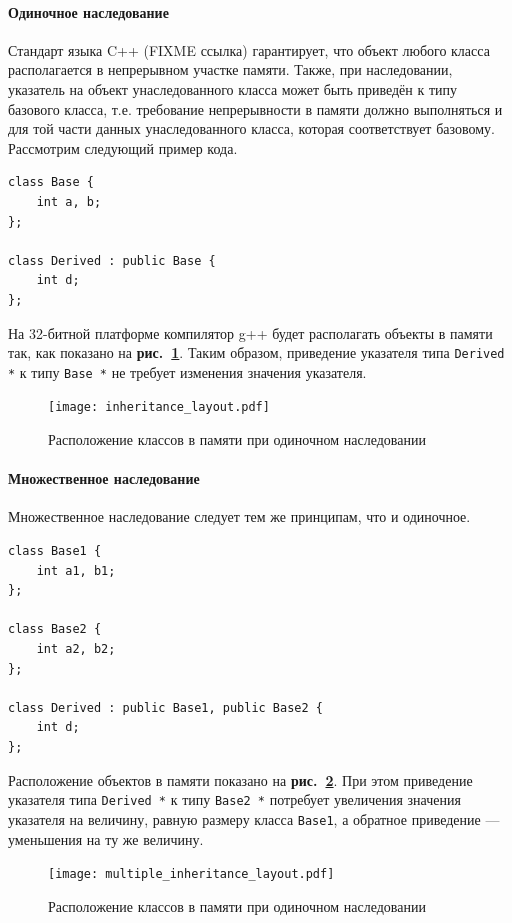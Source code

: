 \documentclass[a4paper,12pt,russian]{article}
\newcommand{\picref}[1]{\textbf{рис.~\ref{#1}}}
\begin{document}
\paragraph{Одиночное наследование}
Стандарт языка C++ (FIXME ссылка) гарантирует, что объект любого класса располагается в непрерывном участке памяти.
Также, при наследовании, указатель на объект унаследованного класса может быть приведён к типу базового класса, т.е. требование непрерывности в памяти должно выполняться и для той части данных унаследованного класса, которая соответствует базовому.
Рассмотрим следующий пример кода.
\begin{lstlisting}
class Base {
    int a, b;
};

class Derived : public Base {
    int d;
};
\end{lstlisting}
На 32-битной платформе компилятор g++ будет располагать объекты в памяти так, как показано на \picref{inheritance_layout_fig}. Таким образом, приведение указателя типа \texttt{Derived *} к типу \texttt{Base *} не требует изменения значения указателя.
\begin{figure}
  \center
  \texttt{[image: inheritance\_layout.pdf]}
  \hfill
  \caption{Расположение классов в памяти при одиночном наследовании}
  \label{inheritance_layout_fig}
\end{figure}

\paragraph{Множественное наследование}
Множественное наследование следует тем же принципам, что и одиночное.
\begin{lstlisting}
class Base1 {
    int a1, b1;
};

class Base2 {
    int a2, b2;
};

class Derived : public Base1, public Base2 {
    int d;
};
\end{lstlisting}
Расположение объектов в памяти показано на \picref{multiple_inheritance_layout_fig}.
При этом приведение указателя типа \texttt{Derived *} к типу \texttt{Base2 *} потребует увеличения значения указателя на величину, равную размеру класса \texttt{Base1}, а обратное приведение --- уменьшения на ту же величину.
\begin{figure}
  \center
  \texttt{[image: multiple\_inheritance\_layout.pdf]}
  \hfill
  \caption{Расположение классов в памяти при одиночном наследовании}
  \label{multiple_inheritance_layout_fig}
\end{figure}
\end{document}
